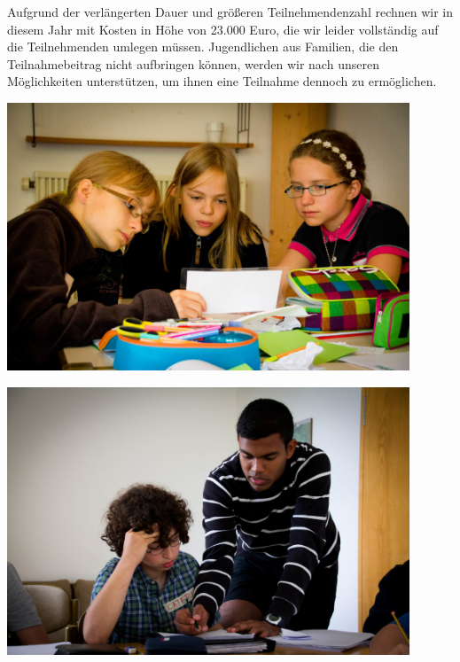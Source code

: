 \documentclass[12pt]{zettel}
\begin{document}
Aufgrund der verlängerten Dauer und größeren Teilnehmendenzahl rechnen wir in diesem Jahr mit Kosten in Höhe von 23.000 Euro, die wir leider vollständig auf die Teilnehmenden umlegen müssen. Jugendlichen aus Familien, die den Teilnahmebeitrag nicht aufbringen können, werden wir nach unseren Möglichkeiten unterstützen, um ihnen eine Teilnahme dennoch zu ermöglichen.


\vfill

\begin{minipage}{0.5\textwidth}
  \raggedright
   \includegraphics[width=0.9\textwidth]{impressionen/klein-08}
\end{minipage}%
\begin{minipage}{0.5\textwidth}
  \raggedleft
 \includegraphics[width=0.9\textwidth]{impressionen/klein-02}
\end{minipage}
\end{document}
